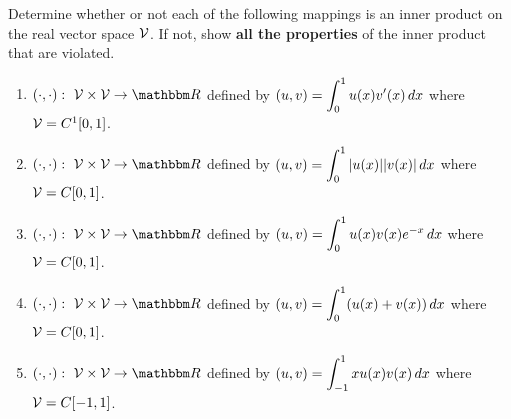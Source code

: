 
Determine whether or not each of the following mappings is an inner product on the real vector space ${\cal V}$. If not, show \textbf{all the properties} of the inner product that are violated.
\\
\begin{enumerate}
\item$\displaystyle{\ip{\cdot,\cdot}:\mbox{ }\CV\times\CV\rightarrow\R}$ defined by $\displaystyle{(u,v) = \int_0^1 u(x) v'(x)\, dx}$ where ${\cal V}=C^1[0,1]$.
\\
\item$\displaystyle{\ip{\cdot,\cdot}:\mbox{ }\CV\times\CV\rightarrow\R}$ defined by $\displaystyle{(u,v) = \int_0^1 |u(x)| |v(x)|\, dx}$ where ${\cal V}=C[0,1]$.
\\
\item$\displaystyle{\ip{\cdot,\cdot}:\mbox{ }\CV\times\CV\rightarrow\R}$ defined by $\displaystyle{(u,v) = \int_0^1 u(x) v(x) e^{-x}\, dx}$ where ${\cal V}=C[0,1]$.
\\
\item$\displaystyle{\ip{\cdot,\cdot}:\mbox{ }\CV\times\CV\rightarrow\R}$ defined by $\displaystyle{(u,v) = \int_0^1 (u(x) + v(x))\, dx}$ where ${\cal V}=C[0,1]$.
\\
\item$\displaystyle{\ip{\cdot,\cdot}:\mbox{ }\CV\times\CV\rightarrow\R}$ defined by $\displaystyle{(u,v)=\int_{-1}^1xu(x)v(x)\,dx}$ where ${\cal V}=C[-1,1]$.
\end{enumerate}




